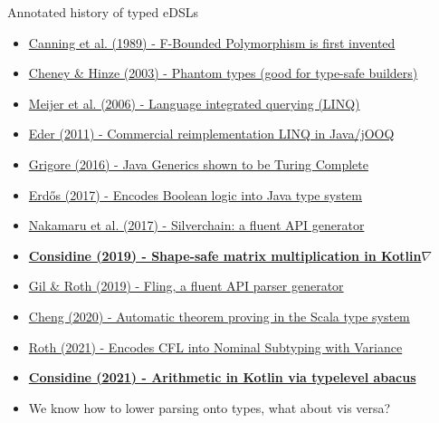 \documentclass{beamer}
\begin{document}
    \begin{frame}{Annotated history of typed eDSLs}
        \begin{itemize}
            \item \href{https://www.cs.utexas.edu/~wcook/papers/FBound89/CookFBound89.pdf}{Canning et al. (1989) - F-Bounded Polymorphism is first invented}
            \item \href{https://ecommons.cornell.edu/bitstream/handle/1813/5614/TR2003-1901.pdf}{Cheney \& Hinze (2003) - Phantom types (good for type-safe builders)}
            \item \href{https://dl.acm.org/doi/pdf/10.1145/1142473.1142552}{Meijer et al. (2006) - Language integrated querying (LINQ)}
            \item \href{https://jooq.org}{Eder (2011) - Commercial reimplementation LINQ in Java/jOOQ}
            \item \href{https://arxiv.org/pdf/1605.05274.pdf}{Grigore (2016) - Java Generics shown to be Turing Complete}
            \item \href{https://github.com/erdos/java-logic}{Erdős (2017) - Encodes Boolean logic into Java type system}
            \item \href{https://dl.acm.org/doi/10.1145/3136040.3136041}{Nakamaru et al. (2017) - Silverchain: a fluent API generator}
            \item \href{http://breandan.net/public/masters_thesis.pdf#2}{\textbf{Considine (2019) - Shape-safe matrix multiplication in Kotlin$\nabla$}}
            \item \href{https://drops.dagstuhl.de/opus/volltexte/2019/10805/pdf/LIPIcs-ECOOP-2019-13.pdf}{Gil \& Roth (2019) - Fling, a fluent API parser generator}
            \item \href{https://github.com/tribbloid/shapesafe}{Cheng (2020) - Automatic theorem proving in the Scala type system}
            \item \href{https://arxiv.org/pdf/2109.03950.pdf}{Roth (2021) - Encodes CFL into Nominal Subtyping with Variance}
            \item \href{https://github.com/breandan/galoisenne}{\textbf{Considine (2021) - Arithmetic in Kotlin via typelevel abacus}}
            \item We know how to lower parsing onto types, what about vis versa?
        \end{itemize}
    \end{frame}
\end{document}
